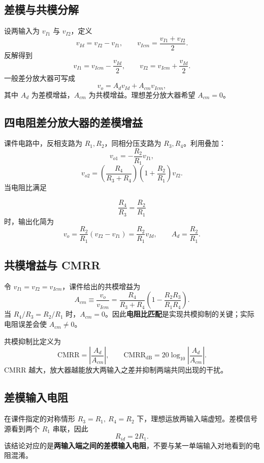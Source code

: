 \documentclass[11pt,fontset=none]{ctexart}
\newcommand{\vo}{v_o}
\begin{document}
\subsection{差模与共模分解}

设两输入为 $v_{I1}$ 与 $v_{I2}$，定义
\[
  v_{Id}=v_{I2}-v_{I1},
  \qquad
  v_{Icm}=\frac{v_{I1}+v_{I2}}{2}.
\]
反解得到
\[
  v_{I1}=v_{Icm}-\frac{v_{Id}}{2},
  \qquad
  v_{I2}=v_{Icm}+\frac{v_{Id}}{2}.
\]
一般差分放大器可写成
\[
  \boxed{\vo=A_d v_{Id}+A_{cm}v_{Icm}},
\]
其中 $A_d$ 为差模增益，$A_{cm}$ 为共模增益。理想差分放大器希望 $A_{cm}=0$。

\subsection{四电阻差分放大器的差模增益}

课件电路中，反相支路为 $R_1,R_2$，同相分压支路为 $R_3,R_4$。利用叠加：
\[
  v_{o1}=-\frac{R_2}{R_1}v_{I1},
\]
\[
  v_{o2}=\left(\frac{R_4}{R_3+R_4}\right)
          \left(1+\frac{R_2}{R_1}\right)v_{I2}.
\]
当电阻比满足
\begin{keybox}
\[
  \boxed{\frac{R_4}{R_3}=\frac{R_2}{R_1}}
\]
时，输出化简为
\[
  \boxed{\vo=\frac{R_2}{R_1}(v_{I2}-v_{I1})
  =\frac{R_2}{R_1}v_{Id}},
  \qquad
  \boxed{A_d=\frac{R_2}{R_1}}.
\]
\end{keybox}

\subsection{共模增益与 CMRR}

令 $v_{I1}=v_{I2}=v_{Icm}$，课件给出的共模增益为
\[
  \boxed{
  A_{cm}\equiv\frac{\vo}{v_{Icm}}
  =\frac{R_4}{R_3+R_4}
  \left(1-\frac{R_2R_3}{R_1R_4}\right)
  }.
\]
当 $R_4/R_3=R_2/R_1$ 时，$A_{cm}=0$。因此\textbf{电阻比匹配}是实现共模抑制的关键；实际电阻误差会使 $A_{cm}\ne0$。

共模抑制比定义为
\[
  \boxed{\mathrm{CMRR}=\left|\frac{A_d}{A_{cm}}\right|},
  \qquad
  \boxed{\mathrm{CMRR}_{\mathrm{dB}}=20\log_{10}\left|\frac{A_d}{A_{cm}}\right|}.
\]
CMRR 越大，放大器越能放大两输入之差并抑制两端共同出现的干扰。

\subsection{差模输入电阻}

在课件指定的对称情形 $R_3=R_1,\ R_4=R_2$ 下，理想运放两输入端虚短。差模信号源看到两个 $R_1$ 串联，因此
\[
  \boxed{R_{id}=2R_1}.
\]
该结论对应的是\textbf{两输入端之间的差模输入电阻}，不要与某一单端输入对地看到的电阻混淆。
\end{document}
